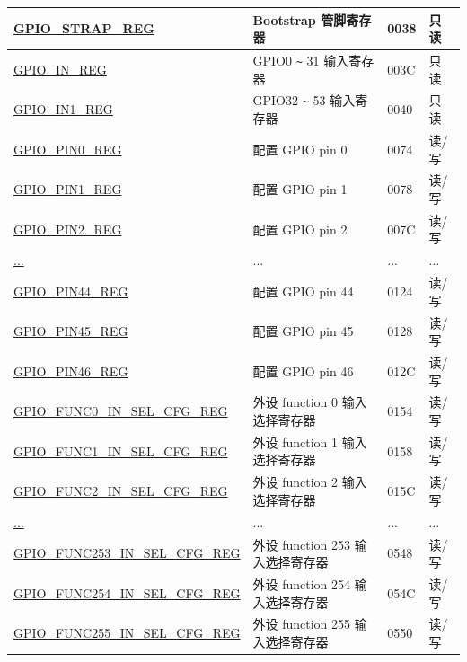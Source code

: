 \begin{longtable}{ | p{6cm} | p{7.2cm} | p{1.3cm} | p{1cm} | }
\hyperref[regdesc:GPIOSTRAPREG]{GPIO\_STRAP\_REG} & Bootstrap 管脚寄存器 & \hexprefix{}0038 & 只读 \\ \hline
\hyperref[regdesc:GPIOINREG]{GPIO\_IN\_REG} & GPIO0 \verb+~+ 31 输入寄存器 & \hexprefix{}003C & 只读 \\ \hline
\hyperref[regdesc:GPIOIN1REG]{GPIO\_IN1\_REG} & GPIO32 \verb+~+ 53 输入寄存器 & \hexprefix{}0040 & 只读 \\ \hline
\hyperref[regdesc:GPIOPINNREG]{GPIO\_PIN0\_REG} & 配置 GPIO pin 0 & \hexprefix{}0074 & 读/写 \\ \hline
\hyperref[regdesc:GPIOPINNREG]{GPIO\_PIN1\_REG} & 配置 GPIO pin 1 & \hexprefix{}0078 & 读/写 \\ \hline
\hyperref[regdesc:GPIOPINNREG]{GPIO\_PIN2\_REG} & 配置 GPIO pin 2 & \hexprefix{}007C & 读/写 \\ \hline
\hyperref[regdesc:GPIOPINNREG]{...} & ... & ... & ... \\ \hline
\hyperref[regdesc:GPIOPINNREG]{GPIO\_PIN44\_REG} & 配置 GPIO pin 44 & \hexprefix{}0124 & 读/写 \\ \hline
\hyperref[regdesc:GPIOPINNREG]{GPIO\_PIN45\_REG} & 配置 GPIO pin 45 & \hexprefix{}0128 & 读/写 \\ \hline
\hyperref[regdesc:GPIOPINNREG]{GPIO\_PIN46\_REG} & 配置 GPIO pin 46 & \hexprefix{}012C & 读/写 \\ \hline
\hyperref[regdesc:GPIOFUNCNINSELCFGREG]{GPIO\_FUNC0\_IN\_SEL\_CFG\_REG} & 外设 function 0 输入选择寄存器 & \hexprefix{}0154 & 读/写 \\ \hline
\hyperref[regdesc:GPIOFUNCNINSELCFGREG]{GPIO\_FUNC1\_IN\_SEL\_CFG\_REG} & 外设 function 1 输入选择寄存器 & \hexprefix{}0158 & 读/写 \\ \hline
\hyperref[regdesc:GPIOFUNCNINSELCFGREG]{GPIO\_FUNC2\_IN\_SEL\_CFG\_REG} & 外设 function 2 输入选择寄存器 & \hexprefix{}015C & 读/写 \\ \hline
\hyperref[regdesc:GPIOFUNCNINSELCFGREG]{...} & ... & ... & ... \\ \hline
\hyperref[regdesc:GPIOFUNCNINSELCFGREG]{GPIO\_FUNC253\_IN\_SEL\_CFG\_REG} & 外设 function 253 输入选择寄存器 & \hexprefix{}0548 & 读/写 \\ \hline
\hyperref[regdesc:GPIOFUNCNINSELCFGREG]{GPIO\_FUNC254\_IN\_SEL\_CFG\_REG} & 外设 function 254 输入选择寄存器 & \hexprefix{}054C & 读/写 \\ \hline
\hyperref[regdesc:GPIOFUNCNINSELCFGREG]{GPIO\_FUNC255\_IN\_SEL\_CFG\_REG} & 外设 function 255 输入选择寄存器 & \hexprefix{}0550 & 读/写 \\ \hline

\end{longtable}
